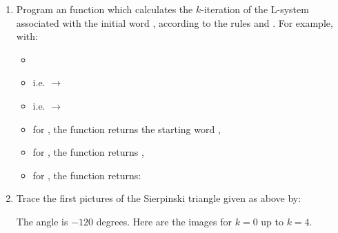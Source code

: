 \documentclass[11pt,class=report,crop=false]{standalone}
\begin{document}
\begin{activite}
\begin{enumerate}
 
  \item Program an   function
  which calculates the $k$-iteration of the L-system associated with the initial word , according to the rules  and .
   For example, with:
  \begin{itemize} 
    \item {}
    \item {} i.e.  $\rightarrow$ 
    \item {} i.e.  $\rightarrow$   
    \item for , the function returns the starting word ,
    \item for , the function returns ,
    \item for , the function returns:    
  \end{itemize}  

  \item Trace the first pictures of the Sierpinski triangle given as above by:  
  
 The angle is $-120$ degrees. Here are the images for $k=0$ up to $k=4$.
  

\end{enumerate}
\end{activite}
\end{document}
